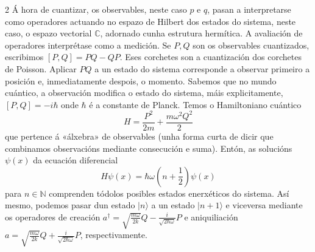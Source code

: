 \begin{multicols}{2}
Á hora de cuantizar, os observables, neste caso $p$ e $q$, pasan a
interpretarse como operadores actuando no espazo de Hilbert dos estados do
sistema, neste caso, o espazo vectorial $\mathbb{C}$, adornado cunha estrutura
hermítica. A avaliación de operadores interprétase como a medición. Se $P, Q$
son os observables cuantizados, escribimos $[P,Q]=PQ-QP$. Eses corchetes son a
cuantización dos corchetes de Poisson. Aplicar $PQ$ a un estado do sistema
corresponde a observar primeiro a posición e, inmediatamente despois, o
momento. Sabemos que no mundo cuántico, a observación modifica o estado do
sistema, máis explicitamente, $[P,Q]=-i\hbar$ onde $\hbar$ é a constante de
Planck. Temos o Hamiltoniano cuántico
%
\begin{equation}
    H=\frac{P^2}{2m}+\frac{m\omega^2Q^2}{2}
\end{equation}
%
que pertence á «álxebra» de observables (unha forma curta de dicir que
combinamos observacións mediante consecución e suma). Entón, as solucións
$\psi(x)$ da ecuación diferencial
%
\begin{equation}
    H\psi(x)=\hbar \omega\left(n+\frac{1}{2}\right) \psi(x)
\end{equation}
%
para $n\in\mathbb{N}$ comprenden tódolos posibles estados enerxéticos do
sistema. Así mesmo, podemos pasar dun estado $|n\rangle$ a un estado
$|n+1\rangle$ e viceversa mediante os operadores de creación
$a^\dagger=\sqrt{\frac{m\omega}{2k}}Q-\frac{i}{\sqrt{2\hbar\omega}}P$ e
aniquiliación $a=\sqrt{\frac{m\omega}{2k}}Q+\frac{i}{\sqrt{2\hbar\omega}}P$,
respectivamente.


\end{multicols}
